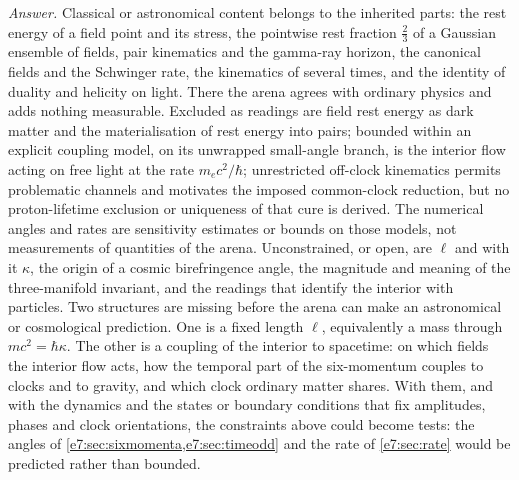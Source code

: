 \emph{Answer.} Classical or astronomical content belongs to the inherited parts: the rest energy of a field point and its stress, the
pointwise rest fraction $\tfrac23$ of a Gaussian ensemble of fields, pair kinematics and the gamma-ray horizon, the canonical fields and the
Schwinger rate, the kinematics of several times, and the identity of duality and helicity on light. There the arena agrees with ordinary physics
and adds nothing measurable. Excluded as readings are field rest energy as dark matter and the materialisation of rest energy into pairs;
bounded within an explicit coupling model, on its unwrapped small-angle branch, is the interior flow acting on free light at the rate
$m_ec^2/\hbar$; unrestricted off-clock kinematics permits problematic channels and motivates the imposed common-clock reduction, but no
proton-lifetime exclusion or uniqueness of that cure is derived. The numerical angles and rates are sensitivity estimates or bounds on those models, not measurements of quantities of
the arena. Unconstrained, or open, are $\ell$ and with it
$\kappa$, the origin of a cosmic birefringence angle, the magnitude and meaning of the three-manifold invariant, and the readings that identify
the interior with particles. Two structures are missing before the arena can make an astronomical or cosmological prediction. One is a fixed
length $\ell$, equivalently a mass through $mc^2=\hbar\kappa$. The other is a coupling of the interior to spacetime: on which fields the interior
flow acts, how the temporal part of the six-momentum couples to clocks and to gravity, and which clock ordinary matter shares. With them, and with
the dynamics and the states or boundary conditions that fix amplitudes, phases and clock orientations, the constraints above could become tests: the angles of \cref{e7:sec:sixmomenta,e7:sec:timeodd} and the rate of \cref{e7:sec:rate} would be predicted
rather than bounded.

